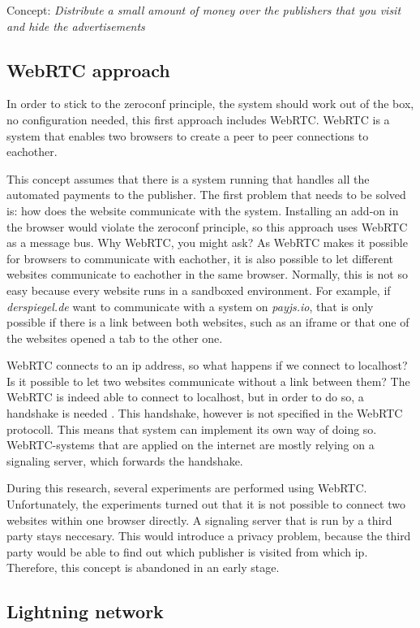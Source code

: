 Concept: \textit{Distribute a small amount of money over the publishers that you visit and hide the advertisements}

\subsection{WebRTC approach}

In order to stick to the zeroconf principle, the system should work out of the box, no configuration needed, this first approach includes WebRTC. WebRTC is a system that enables two browsers to create a peer to peer connections to eachother.

This concept assumes that there is a system running that handles all the automated payments to the publisher. The first problem that needs to be solved is: how does the website communicate with the system. Installing an add-on in the browser would violate the zeroconf principle, so this approach uses WebRTC as a message bus. Why WebRTC, you might ask? As WebRTC makes it possible for browsers to communicate with eachother, it is also possible to let different websites communicate to eachother in the same browser. Normally, this is not so easy because every website runs in a sandboxed environment. For example, if \textit{derspiegel.de} want to communicate with a system on \textit{payjs.io}, that is only possible if there is a link between both websites, such as an iframe or that one of the websites opened a tab to the other one. 

WebRTC connects to an ip address, so what happens if we connect to localhost? Is it possible to let two websites communicate without a link between them? The WebRTC is indeed able to connect to localhost, but in order to do so, a handshake is needed \cite{dutton2013webrtc}. This handshake, however is not specified in the WebRTC protocoll. This means that system can implement its own way of doing so. WebRTC-systems that are applied on the internet are mostly relying on a signaling server, which forwards the handshake. 

During this research, several experiments are performed using WebRTC. Unfortunately, the experiments turned out that it is not possible to connect two websites within one browser directly. A signaling server that is run by a third party stays neccesary. This would introduce a privacy problem, because the third party would be able to find out which publisher is visited from which ip. Therefore, this concept is abandoned in an early stage.
\subsection{Lightning network}

